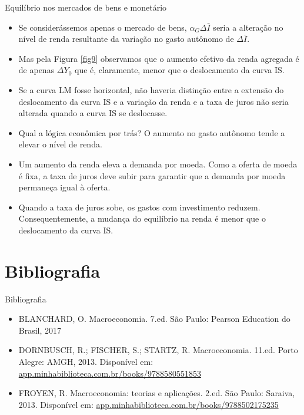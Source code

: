 \documentclass[10pt]{beamer}
\begin{document}
\begin{frame}{Equilíbrio nos mercados de bens e monetário}
\begin{itemize}
    \item Se considerássemos apenas o mercado de bens, $\alpha_G\Delta\bar{I}$ seria a alteração no nível de renda resultante da variação no gasto autônomo de $\Delta\bar{I}$.
    \bigskip
    \item Mas pela Figura \ref{fig9} observamos que o aumento efetivo da renda agregada é de apenas $\Delta Y_0$ que é, claramente, menor que o deslocamento da curva IS.
    \bigskip
    \item Se a curva LM fosse horizontal, não haveria distinção entre a extensão do deslocamento da curva IS e a variação da renda e a taxa de juros não seria alterada quando a curva IS se deslocasse.
    \bigskip
    \item Qual a lógica econômica por trás? O aumento no gasto autônomo tende a elevar o nível de renda.
    \bigskip
    \item Um aumento da renda eleva a demanda por moeda. Como a oferta de moeda é fixa, a taxa de juros deve subir para garantir que a demanda por moeda permaneça igual à oferta.
    \bigskip
    \item Quando a taxa de juros sobe, os gastos com investimento reduzem. Consequentemente, a mudança do equilíbrio na renda é menor que o deslocamento da curva IS.    
\end{itemize}
\end{frame}

\section{Bibliografia}
\begin{frame}{ Bibliografia}
    \begin{itemize}
        \item BLANCHARD, O. Macroeconomia. 7.ed. São Paulo: Pearson Education do Brasil, 2017\medskip        
        \item DORNBUSCH, R.; FISCHER, S.; STARTZ, R. Macroeconomia. 11.ed. Porto Alegre: AMGH, 2013. Disponível em: \href{https://app.minhabiblioteca.com.br/books/9788580551853}{app.minhabiblioteca.com.br/books/9788580551853}\medskip
        \item FROYEN, R. Macroeconomia: teorias e aplicações. 2.ed. São Paulo: Saraiva, 2013. Disponível em: \href{https://app.minhabiblioteca.com.br/books/9788502175235}{app.minhabiblioteca.com.br/books/9788502175235}\medskip        
    \end{itemize}
\end{frame}
\end{document}
